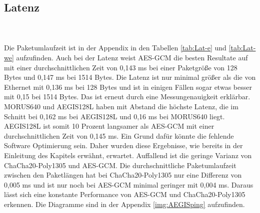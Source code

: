 \subsection{Latenz}
\\
\\
Die Paketumlaufzeit ist in der Appendix in den Tabellen \ref{tab:Lat-e} und \ref{tab:Lat-we} aufzufinden.
Auch bei der Latenz weist \gls{AES-GCM} die besten Resultate auf mit einer durchschnittlichen Zeit von 0,143 ms bei einer Paketgröße von 128 Bytes und 0,147 ms bei 1514 Bytes. Die Latenz ist nur minimal größer als die von Ethernet mit 0,136 ms bei 128 Bytes und ist in einigen Fällen sogar etwas besser mit 0,15 bei 1514 Bytes. Das ist erneut durch eine Messungenauigkeit erklärbar. MORUS640 und AEGIS128L haben mit Abstand die höchste Latenz, die im Schnitt bei 0,162 ms bei AEGIS128L und 0,16 ms bei MORUS640 liegt. AEGIS128L ist somit 10 Prozent langsamer als \gls{AES-GCM} mit einer durchschnittlichen Zeit von 0,145 ms. Ein Grund dafür könnte die fehlende Software Optimierung sein. Daher wurden diese Ergebnisse, wie bereits in der Einleitung des Kapitels erwähnt, erwartet. Auffallend ist die geringe Varianz von ChaCha20-Poly1305 und AES-GCM. Die durchschnittliche Paketumlaufzeit zwischen den Paketlängen hat bei ChaCha20-Poly1305 nur eine Differenz von 0,005 ms und ist nur noch bei AES-GCM minimal geringer mit 0,004  ms. Daraus lässt sich eine konstante Performance von AES-GCM und ChaCha20-Poly1305 erkennen. Die Diagramme sind in der Appendix \ref{img:AEGISping} aufzufinden.
